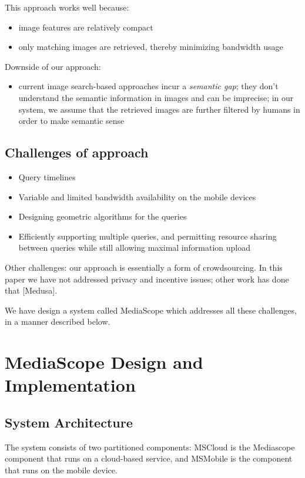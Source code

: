 \documentclass[10pt]{article}
\begin{document}
This approach works well because:
\begin{itemize}
\item image features are relatively compact
\item only matching images are retrieved, thereby minimizing bandwidth usage
\end{itemize}

Downside of our approach:
\begin{itemize}
\item current image search-based approaches incur a \emph{semantic gap}; they
  don't understand the semantic information in images and can be
  imprecise; in our system, we assume that the retrieved images are
  further filtered by humans in order to make semantic sense
\end{itemize}
\subsection{Challenges of approach}
\label{sec-2-3}


\begin{itemize}
\item Query timelines
\item Variable and limited bandwidth availability on the mobile devices
\item Designing geometric algorithms for the queries
\item Efficiently supporting multiple queries, and  permitting resource
  sharing between queries while still allowing maximal information
  upload
\end{itemize}

Other challenges: our approach is essentially a form of
crowdsourcing. In this paper we have not addressed privacy and
incentive issues; other work has done that [Medusa]. 

We have design a system called MediaScope which addresses all these
challenges, in a manner described below.
\section{MediaScope Design and Implementation}
\label{sec-3}
\subsection{System Architecture}
\label{sec-3-1}


The system consists of two partitioned components: MSCloud is the
Mediascope component that runs on a cloud-based service, and MSMobile
is the component that runs on the mobile device.
\end{document}
